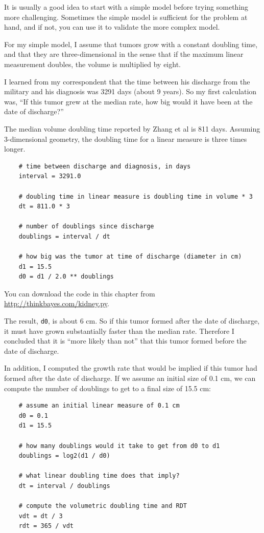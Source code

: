 \documentclass[12pt]{book}
\begin{document}
It is usually a good idea to start with a simple model before
trying something more challenging.  Sometimes the simple model is
sufficient for the problem at hand, and if not, you can use it
to validate the more complex model.

For my simple model, I assume that tumors grow with a constant
doubling time, and that they are three-dimensional in the sense that
if the maximum linear measurement doubles, the volume is multiplied by
eight.

I learned from my correspondent that the time between his discharge
from the military and his diagnosis was 3291 days (about 9 years).
So my first calculation was, ``If this tumor grew at the median
rate, how big would it have been at the date of discharge?''

The median volume doubling time reported by Zhang et al is 811 days.
Assuming 3-dimensional geometry, the doubling time for a linear
measure is three times longer.

\begin{verbatim}
    # time between discharge and diagnosis, in days 
    interval = 3291.0

    # doubling time in linear measure is doubling time in volume * 3
    dt = 811.0 * 3

    # number of doublings since discharge
    doublings = interval / dt

    # how big was the tumor at time of discharge (diameter in cm)
    d1 = 15.5
    d0 = d1 / 2.0 ** doublings
\end{verbatim}

You can download the code in this chapter from
\url{http://thinkbayes.com/kidney.py}.

The result, {\tt d0}, is about 6 cm.  So if this tumor formed after
the date of discharge, it must have grown substantially faster than
the median rate.  Therefore I concluded that it is ``more likely than
not'' that this tumor formed before the date of discharge.

In addition, I computed the growth rate that would be implied
if this tumor had formed after the date of discharge.  If we
assume an initial size of 0.1 cm, we can compute the number of
doublings to get to a final size of 15.5 cm:

\begin{verbatim}
    # assume an initial linear measure of 0.1 cm
    d0 = 0.1
    d1 = 15.5

    # how many doublings would it take to get from d0 to d1
    doublings = log2(d1 / d0)

    # what linear doubling time does that imply?
    dt = interval / doublings

    # compute the volumetric doubling time and RDT
    vdt = dt / 3
    rdt = 365 / vdt
\end{verbatim}
\end{document}
